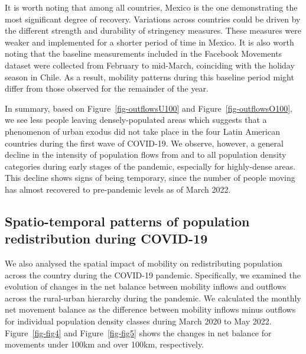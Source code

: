 \documentclass[
  10pt,
  letterpaper,
  DIV=11,
  numbers=noendperiod]{scrartcl}
\begin{document}
It is worth noting that among all countries, Mexico is the one
demonstrating the most significant degree of recovery. Variations across
countries could be driven by the different strength and durability of
stringency measures. These measures were weaker and implemented for a
shorter period of time in Mexico. It is also worth noting that the
baseline measurements included in the Facebook Movements dataset were
collected from February to mid-March, coinciding with the holiday season
in Chile. As a result, mobility patterns during this baseline period
might differ from those observed for the remainder of the year.

In summary, based on Figure~\ref{fig-outflowsU100} and
Figure~\ref{fig-outflowsO100}, we see less people leaving
densely-populated areas which suggests that a phenomenon of urban exodus
did not take place in the four Latin American countries during the first
wave of COVID-19. We observe, however, a general decline in the
intensity of population flows from and to all population density
categories during early stages of the pandemic, especially for
highly-dense areas. This decline shows signs of being temporary, since
the number of people moving has almost recovered to pre-pandemic levels
as of March 2022.

\hypertarget{spatio-temporal-patterns-of-population-redistribution-during-covid-19}{%
\subsection{Spatio-temporal patterns of population redistribution during
COVID-19}\label{spatio-temporal-patterns-of-population-redistribution-during-covid-19}}

We also analysed the spatial impact of mobility on redistributing
population across the country during the COVID-19 pandemic.
Specifically, we examined the evolution of changes in the net balance
between mobility inflows and outflows across the rural-urban hierarchy
during the pandemic. We calculated the monthly net movement balance as
the difference between mobility inflows minus outflows for individual
population density classes during March 2020 to May 2022.
Figure~\ref{fig-fig4} and Figure~\ref{fig-fig5} shows the changes in net
balance for movements under 100km and over 100km, respectively.
\end{document}

